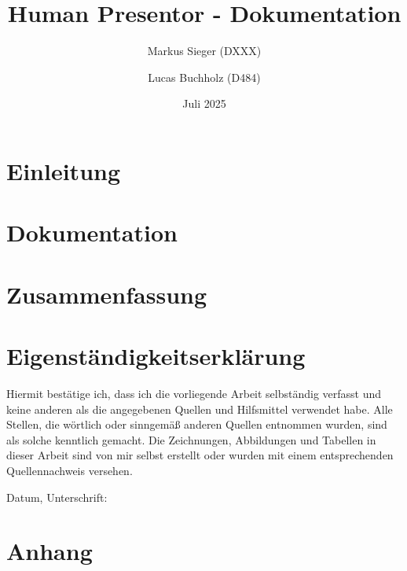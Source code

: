\documentclass[12pt, headheight=21.8pt, footheight=21.8pt, oneside]{scrbook}
\title{Human Presentor - Dokumentation}
\author{Markus Sieger (DXXX) \and Lucas Buchholz (D484)}
\date{Juli 2025}
\begin{document}
\maketitle
\tableofcontents
\pagestyle{empty}



\chapter{Einleitung} \pagestyle{headings}


\chapter{Dokumentation}


\chapter{Zusammenfassung}



\chapter{Eigenständigkeitserklärung}
Hiermit bestätige ich, dass ich die vorliegende Arbeit 
selbständig verfasst und keine anderen als die 
angegebenen Quellen und Hilfsmittel verwendet habe. 
Alle Stellen, die wörtlich oder sinngemäß anderen 
Quellen entnommen wurden, sind als solche kenntlich 
gemacht. Die Zeichnungen, Abbildungen und Tabellen in 
dieser Arbeit sind von mir selbst erstellt oder wurden mit 
einem entsprechenden Quellennachweis versehen.

Datum, Unterschrift:




\appendix

\chapter{Anhang}
\end{document}
